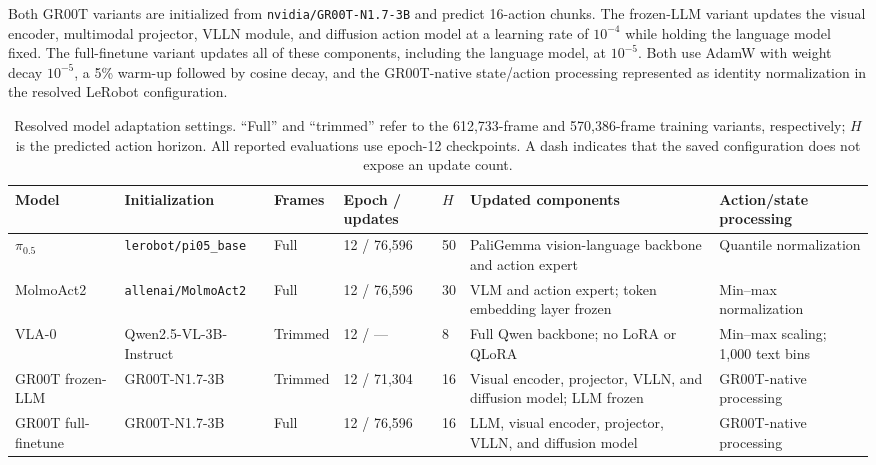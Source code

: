 Both GR00T variants are initialized from \texttt{nvidia/GR00T-N1.7-3B} and predict 16-action chunks. The frozen-LLM variant updates the visual encoder, multimodal projector, VLLN module, and diffusion action model at a learning rate of $10^{-4}$ while holding the language model fixed. The full-finetune variant updates all of these components, including the language model, at $10^{-5}$. Both use AdamW with weight decay $10^{-5}$, a 5\% warm-up followed by cosine decay, and the GR00T-native state/action processing represented as identity normalization in the resolved LeRobot configuration.

\begin{table}[t]
\centering
\scriptsize
\setlength{\tabcolsep}{2.5pt}
\caption{Resolved model adaptation settings. ``Full'' and ``trimmed'' refer to the 612,733-frame and 570,386-frame training variants, respectively; $H$ is the predicted action horizon. All reported evaluations use epoch-12 checkpoints. A dash indicates that the saved configuration does not expose an update count.}
\label{tab:training_configuration}
\begin{tabular}{p{} p{} p{} p{} p{} p{} p{}}
\toprule
\textbf{Model} & \textbf{Initialization} & \textbf{Frames} & \textbf{Epoch / updates} & \textbf{$H$} & \textbf{Updated components} & \textbf{Action/state processing} \\
\midrule
$\pi_{0.5}$
& \texttt{lerobot/pi05\_base}
& Full
& 12 / 76,596
& 50
& PaliGemma vision-language backbone and action expert
& Quantile normalization \\

MolmoAct2
& \texttt{allenai/MolmoAct2}
& Full
& 12 / 76,596
& 30
& VLM and action expert; token embedding layer frozen
& Min--max normalization \\

VLA-0
& Qwen2.5-VL-3B-Instruct
& Trimmed
& 12 / ---
& 8
& Full Qwen backbone; no LoRA or QLoRA
& Min--max scaling; 1,000 text bins \\

GR00T frozen-LLM
& GR00T-N1.7-3B
& Trimmed
& 12 / 71,304
& 16
& Visual encoder, projector, VLLN, and diffusion model; LLM frozen
& GR00T-native processing \\

GR00T full-finetune
& GR00T-N1.7-3B
& Full
& 12 / 76,596
& 16
& LLM, visual encoder, projector, VLLN, and diffusion model
& GR00T-native processing \\
\bottomrule
\end{tabular}
\end{table}

